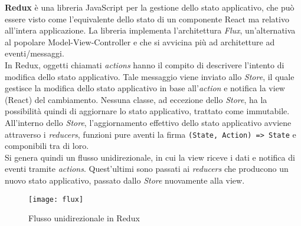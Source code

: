 \textbf{Redux} è una libreria JavaScript per la gestione dello stato applicativo, che può essere visto come l'equivalente dello stato di un componente React ma relativo all'intera applicazione. La libreria implementa l'architettura \textit{Flux}, un'alternativa al popolare Model-View-Controller e che si avvicina più ad architetture ad eventi/messaggi. \\

In Redux, oggetti chiamati \textit{actions} hanno il compito di descrivere l'intento di modifica dello stato applicativo. Tale messaggio viene inviato allo \textit{Store}, il quale gestisce la modifica dello stato applicativo in base all'\textit{action} e notifica la view (React) del cambiamento. Nessuna classe, ad eccezione dello \textit{Store}, ha la possibilità quindi di aggiornare lo stato applicativo, trattato come immutabile. \\

All'interno dello \textit{Store}, l'aggiornamento effettivo dello stato applicativo avviene attraverso i \textit{reducers}, funzioni pure aventi la firma \texttt{(State, Action) => State} e componibili tra di loro. \\

Si genera quindi un flusso unidirezionale, in cui la view riceve i dati e notifica di eventi tramite \textit{actions}. Quest'ultimi sono passati ai \textit{reducers} che producono un nuovo stato applicativo, passato dallo \textit{Store} nuovamente alla view.

\begin{figure}[H] 
  \centering 
  \texttt{[image: flux]} 
  \caption{Flusso unidirezionale in Redux}
\end{figure}
